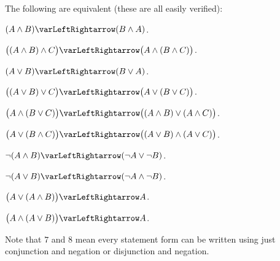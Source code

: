 \documentclass[10pt]{article}
\let\eiff=\varLeftRightarrow
\begin{document}
The following are equivalent (these are all easily verified):
\benum
    \item $(A\land B)\eiff(B\land A)$.
    \item $\bigl((A\land B)\land C\bigr)\eiff\bigl(A\land(B\land C)\bigr)$.
    \item $(A\lor B)\eiff(B\lor A)$.
    \item $\bigl((A\lor B)\lor C\bigr)\eiff\bigl(A\lor(B\lor C)\bigr)$.
    \item $\bigl(A\land(B\lor C)\bigr)\eiff\bigl((A\land B)\lor(A\land C)\bigr)$.
    \item $\bigl(A\lor(B\land C)\bigr)\eiff\bigl((A\lor B)\land(A\lor C)\bigr)$.
    \item $\neg(A\land B)\eiff(\neg A\lor\neg B)$.
    \item $\neg(A\lor B)\eiff(\neg A\land\neg B)$.
    \item $\bigl(A\lor(A\land B)\bigr)\eiff A$.
    \item $\bigl(A\land(A\lor B)\bigr)\eiff A$.
\eenum

Note that $7$ and $8$ mean every statement form can be written using just conjunction and negation or disjunction and negation.
\end{document}
